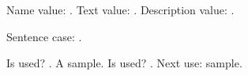 \documentclass{article}
\begin{document}
Name value: .
Text value: .
Description value: .

Sentence case: .

Is used? .
A \gls{sample}.
Is used? .
Next use: \gls{sample}.

\printglossaries
\end{document}
